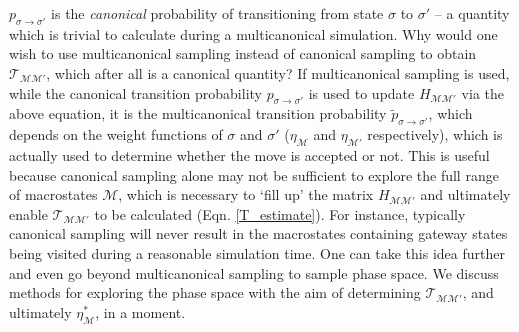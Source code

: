 \documentclass{report}
\begin{document}
$p_{\sigma\to\sigma'}$ is the \emph{canonical} probability of transitioning from state $\sigma$ to $\sigma'$ -- a quantity which is trivial to calculate
during a multicanonical simulation.
Why would one wish to use multicanonical sampling instead of canonical sampling to obtain $\mathcal{T}_{\mathcal{MM}'}$, which after all is a canonical
quantity? If multicanonical sampling is used, while the canonical transition probability $p_{\sigma\to\sigma'}$ is used to update $H_{\mathcal{M}\mathcal{M}'}$
via the above equation, it is the multicanonical transition probability $\tilde{p}_{\sigma\to\sigma'}$, which depends on the weight functions of
$\sigma$ and $\sigma'$ ($\eta_{\mathcal{M}}$ and $\eta_{\mathcal{M}'}$ respectively), which is actually used to determine whether the move is accepted or not.
This is useful because canonical sampling alone may not be sufficient to explore the full range of macrostates $\mathcal{M}$, which is necessary to 
`fill up' the matrix $H_{\mathcal{M}\mathcal{M}'}$ and ultimately enable $\mathcal{T}_{\mathcal{M}\mathcal{M}'}$ to be calculated (Eqn. \eqref{T_estimate}). 
For instance, typically canonical sampling will never result in the macrostates containing gateway states being visited during a reasonable simulation
time.
One can take this idea further and even go beyond multicanonical sampling to sample phase space. We discuss methods for exploring the phase space
with the aim of determining $\mathcal{T}_{\mathcal{MM}'}$, and ultimately $\eta_{\mathcal{M}}^*$, in a moment.
\end{document}
